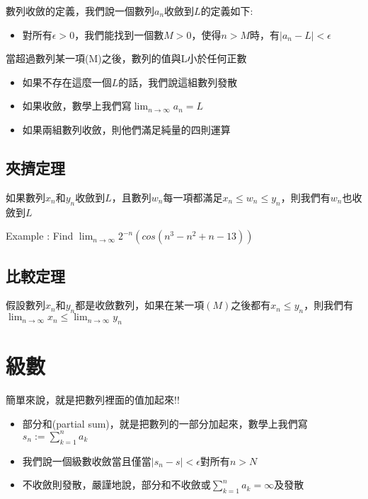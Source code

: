 \documentclass[
]{book}
\providecommand{\tightlist}{%
  \setlength{\itemsep}{0pt}\setlength{\parskip}{0pt}}
\begin{document}
數列收斂的定義，我們說一個數列\({a_n}\)收斂到\(L\)的定義如下:

\begin{itemize}
\tightlist
\item
  對所有\(\epsilon>0\)，我們能找到一個數\(M>0\)，使得\(n>M\)時，有\(|a_n - L|<\epsilon\)
\end{itemize}

當超過數列某一項(M)之後，數列的值與L小於任何正數

\begin{itemize}
\tightlist
\item
  如果不存在這麼一個\(L\)的話，我們說這組數列發散
\item
  如果收斂，數學上我們寫\(\lim_{n \to \infty}a_n = L\)
\item
  如果兩組數列收斂，則他們滿足純量的四則運算
\end{itemize}

\hypertarget{ux593eux64e0ux5b9aux7406}{%
\subsection{夾擠定理}\label{ux593eux64e0ux5b9aux7406}}

如果數列\({x_n}\)和\({y_n}\)收斂到\(L\)，且數列\(w_n\)每一項都滿足\(x_n \leq w_n \leq y_n\)，則我們有\(w_n\)也收斂到\(L\)

Example : Find \(\lim_{n \to \infty}2^{-n}(cos(n^3-n^2+n-13))\)

\hypertarget{ux6bd4ux8f03ux5b9aux7406}{%
\subsection{比較定理}\label{ux6bd4ux8f03ux5b9aux7406}}

假設數列\({x_n}\)和\({y_n}\)都是收斂數列，如果在某一項\((M)\)之後都有\({x_n} \leq {y_n}\)，則我們有\(\lim_{n\to\infty}x_n \leq \lim_{n\to\infty}y_n\)

\hypertarget{ux7d1aux6578}{%
\section{級數}\label{ux7d1aux6578}}

簡單來說，就是把數列裡面的值加起來!!

\begin{itemize}
\tightlist
\item
  部分和(partial sum)，就是把數列的一部分加起來，數學上我們寫\(s_n := \sum_{k=1}^na_k\)
\item
  我們說一個級數收斂當且僅當\(|s_n - s|<\epsilon\)對所有\(n>N\)
\item
  不收斂則發散，嚴謹地說，部分和不收斂或\(\sum_{k=1}^na_k = \infty\)及發散
\end{itemize}
\end{document}
